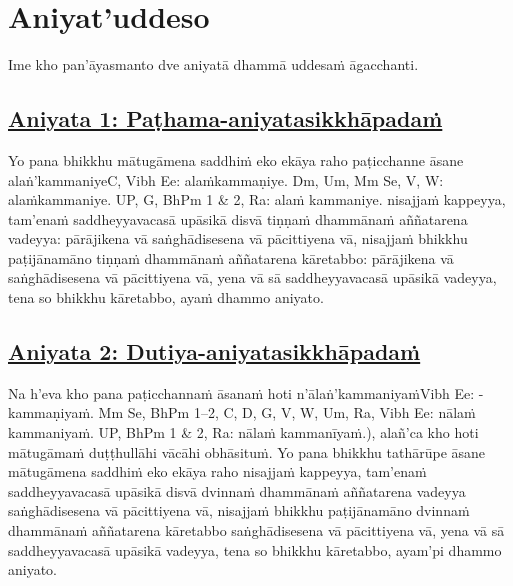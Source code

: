 
\section{Aniyat'uddeso}
\label{aniy}

\begin{intro}
	Ime kho pan'āyasmanto dve aniyatā dhammā uddesaṁ āgacchanti.
\end{intro}

\subsection*{\hyperref[unc1]{Aniyata 1: Paṭhama-aniyatasikkhāpadaṁ}}
\label{aniy1}

Yo pana bhikkhu mātugāmena saddhiṁ eko ekāya raho paṭicchanne āsane alaṅ'kammaniye\makeatletter\hyperlink{endnote-appendix}\makeatother C, Vibh Ee: alaṁkammaṇiye. Dm, Um, Mm Se, V, W: alaṁkammaniye. UP, G,
BhPm 1 & 2, Ra: alaṁ kammaniye. nisajjaṁ kappeyya, tam'enaṁ saddheyyavacasā upāsikā disvā tiṇṇaṁ dhammānaṁ aññatarena vadeyya: pārājikena vā saṅghādisesena vā pācittiyena vā, nisajjaṁ bhikkhu paṭijānamāno tiṇṇaṁ dhammānaṁ aññatarena kāretabbo: pārājikena vā saṅghādisesena vā pācittiyena vā, yena vā sā saddheyyavacasā upāsikā vadeyya, tena so bhikkhu kāretabbo, ayaṁ dhammo aniyato.



\subsection*{\hyperref[unc2]{Aniyata 2: Dutiya-aniyatasikkhāpadaṁ}}
\label{aniy2}

Na h'eva kho pana paṭicchannaṁ āsanaṁ hoti n'ālaṅ'kammaniyaṁ\makeatletter\hyperlink{endnote-appendix}\makeatother Vibh Ee: -kammaṇiyaṁ. Mm Se, BhPm 1–2, C, D, G, V, W, Um, Ra, Vibh Ee: nālaṁ kammaniyaṁ. UP, BhPm 1 & 2, Ra: nālaṁ
kammanīyaṁ.), alañ'ca kho hoti mātugāmaṁ duṭṭhullāhi vācāhi obhāsituṁ. Yo pana bhikkhu tathārūpe āsane mātugāmena saddhiṁ eko ekāya raho nisajjaṁ kappeyya, tam'enaṁ saddheyyavacasā upāsikā disvā dvinnaṁ dhammānaṁ aññatarena vadeyya saṅghādisesena vā pācittiyena vā, nisajjaṁ bhikkhu paṭijānamāno dvinnaṁ dhammānaṁ aññatarena kāretabbo saṅghādisesena vā pācittiyena vā, yena vā sā saddheyyavacasā upāsikā vadeyya, tena so bhikkhu kāretabbo, ayam'pi dhammo aniyato.




